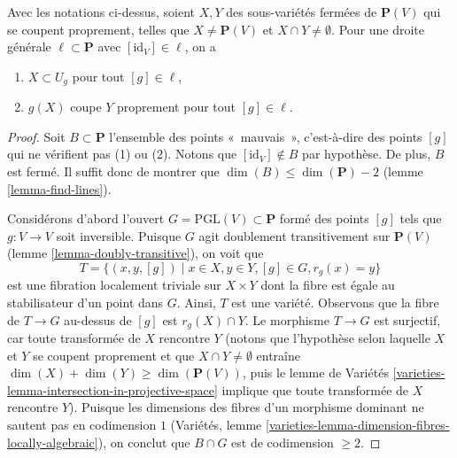 \begin{lemma}
\label{lemma-make-family}
Avec les notations ci-dessus, soient $X, Y$ des sous-variétés fermées de $\mathbf{P}(V)$
qui se coupent proprement, telles que $X \not = \mathbf{P}(V)$ et
$X \cap Y \not = \emptyset$. Pour une droite générale $\ell \subset \mathbf{P}$
avec $[\text{id}_V] \in \ell$, on a
\begin{enumerate}
\item $X \subset U_g$ pour tout $[g] \in \ell$,
\item $g(X)$ coupe $Y$ proprement pour tout $[g] \in \ell$.
\end{enumerate}
\end{lemma}

\begin{proof}
Soit $B \subset \mathbf{P}$ l'ensemble des points «~mauvais~», c'est-à-dire des
points $[g]$ qui ne vérifient pas (1) ou (2). Notons que
$[\text{id}_V] \not \in B$ par hypothèse. De plus, $B$ est fermé.
Il suffit donc de montrer que $\dim(B) \leq \dim(\mathbf{P}) - 2$
(lemme \ref{lemma-find-lines}).

\medskip\noindent
Considérons d'abord l'ouvert $G = \text{PGL}(V) \subset \mathbf{P}$
formé des points $[g]$ tels que $g : V \to V$ soit inversible.
Puisque $G$ agit doublement transitivement sur $\mathbf{P}(V)$
(lemme \ref{lemma-doubly-transitive}),
on voit que
$$
T = \{(x, y, [g]) \mid x \in X, y \in Y, [g] \in G, r_g(x) = y\}
$$
est une fibration localement triviale sur $X \times Y$ dont la fibre est égale
au stabilisateur d'un point dans $G$. Ainsi, $T$ est une variété.
Observons que la fibre de $T \to G$ au-dessus de $[g]$ est $r_g(X) \cap Y$.
Le morphisme $T \to G$ est surjectif, car toute transformée de $X$
rencontre $Y$ (notons que l'hypothèse selon laquelle $X$ et $Y$ se coupent
proprement et que $X \cap Y \not = \emptyset$ entraîne
$\dim(X) + \dim(Y) \geq \dim(\mathbf{P}(V))$, puis le
lemme de Variétés \ref{varieties-lemma-intersection-in-projective-space}
implique que toute transformée de $X$ rencontre $Y$).
Puisque les dimensions des fibres d'un morphisme dominant ne
sautent pas en codimension $1$
(Variétés, lemme \ref{varieties-lemma-dimension-fibres-locally-algebraic}),
on conclut que $B \cap G$ est de codimension $\geq 2$.


\end{proof}
